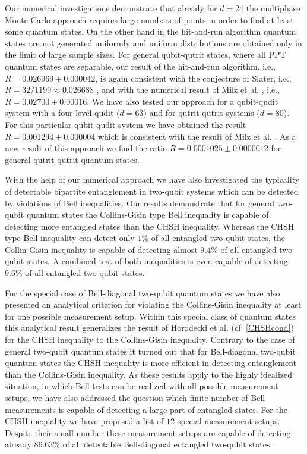 \documentclass[12pt]{iopart}
\begin{document}
Our numerical investigations demonstrate that already for $d=24$ the multiphase Monte Carlo approach requires
large numbers of points in order to find at least some quantum states. On the 
other hand in the hit-and-run algorithm quantum states are not generated uniformly and uniform distributions are obtained only in the limit of large sample sizes.
For general qubit-qutrit states, where all PPT quantum states are separable, our result of the hit-and-run algorithm,
i.e., $R=0.026969 \pm 0.000042$, is again consistent with the conjecture of Slater, i.e., $R=32/1199\approx 0.026688$ \cite{Slaterqutrit}, and with the numerical result of  Milz et al. \cite{Milz}, 
i.e., $R=0.02700 \pm 0.00016$. We have also tested our approach for a qubit-qudit system with a four-level qudit ($d=63$) and for qutrit-qutrit systems ($d=80$). 
For this particular qubit-qudit system we have obtained the result $R=0.001294 \pm 0.000004$ which is consistent with the result of
Milz et al. \cite{Milz}. 
As a new result of this approach we find the ratio $R=0.0001025 \pm 0.0000012$ for general qutrit-qutrit quantum states.

With the help of our numerical approach we have also investigated  the typicality of detectable bipartite entanglement in two-qubit systems which can be detected by violations of Bell inequalities.
Our results demonstrate that for general two-qubit quantum states the Collins-Gisin type Bell inequality is capable of detecting more entangled states than the CHSH inequality.  
Whereas the CHSH type Bell inequality can detect only $1\%$ of all entangled two-qubit states, the Collin-Gisin inequality is capable of detecting 
 almost $9.4\%$ of all entangled two-qubit states.  A combined test of both inequalities is even capable of detecting $9.6\%$ of all entangled two-qubit states. 
 
 For the special case of Bell-diagonal two-qubit quantum states we have also presented an analytical criterion for violating the Collins-Gisin inequality at least for one possible measurement setup. Within this special class of quantum states this analytical result generalizes the result of Horodecki et al.
 \cite{Horodecki95} (cf. \eqref{CHSHcond}) for the CHSH inequality to the Collins-Gisin inequality. Contrary to the case of general two-qubit quantum states it turned out that for Bell-diagonal two-qubit quantum states the CHSH inequality is more efficient in detecting entanglement than the Collins-Gisin inequality. 
As these results apply to the highly idealized situation, in which Bell tests can be realized 
with all possible measurement setups, we have also addressed the question which finite number of Bell measurements is capable of detecting a large part of  entangled states. 
For the CHSH inequality we have proposed a list of $12$ special measurement setups. Despite their small number these measurement setups are capable of detecting already $86.63\%$ of all detectable Bell-diagonal 
entangled two-qubit states. 
\end{document}
